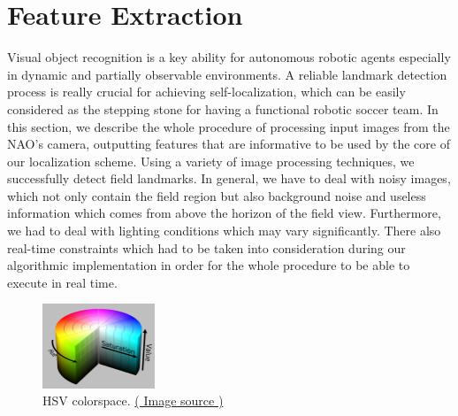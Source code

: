 \documentclass[	DIV=calc,%
							paper=a4,%
							fontsize=9pt,%
							twocolumn]{scrartcl}	 					%
\begin{document}
\section{Feature Extraction}
Visual object recognition is a key ability for autonomous robotic agents especially in dynamic and partially observable environments. A reliable landmark detection process is really crucial for achieving self-localization, which can be easily considered as the stepping stone for having a functional robotic soccer team. In this section, we describe the whole procedure of processing input images from the NAO's camera, outputting features that are informative to be used by the core of our localization scheme.  Using a variety of image processing techniques, we successfully detect field landmarks. In general, we have to deal with noisy images, which not only contain the field region but also background noise and useless information which comes from above the horizon of the field view. Furthermore, we had to deal with lighting conditions which may vary significantly.
There also real-time constraints which had to be taken into consideration during our algorithmic implementation in order for the whole procedure to be able to execute in real time.

\begin{figure}[t!]
  \caption{HSV colorspace. \href{http://en.wikipedia.org/wiki/HSL_and_HSV}{( Image source )}}
  \label{hsv}
  \centering
    \includegraphics[width=0.3\textwidth]{figures/1280px-HSV_color_solid_cylinder_alpha_lowgamma.png}
\end{figure}
\end{document}
